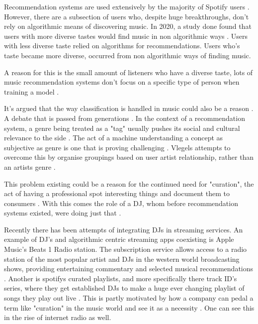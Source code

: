 Recommendation systems are used extensively by the majority of Spotify users \citep{spotify_spotify_2020}. However, there are a subsection of users who, despite huge breakthroughs, don't rely on algorithmic means of discovering music. In 2020, a study done found that users with more diverse tastes would find music in non algorithmic ways \citep{anderson_algorithmic_2020}. Users with less diverse taste relied on algorithms for recommendations. Users who's taste became more diverse, occurred from non algorithmic ways of finding music.

A reason for this is the small amount of listeners who have a diverse taste, lots of music recommendation systems don't focus on a specific type of person when training a model \citep{laplante_improving_2014}.

It's argued that the way classification is handled in music could also be a reason \citep{porcaro_diversity_2021}. A debate that is passed from generations \citep{moles_sociodynamique_2019} \citep{dimaggio_classification_1987} \citep{bourdieu_distinction_2010}. In the context of a recommendation system, a genre being treated as a "tag" usually pushes its social and cultural relevance to the side \citep{porcaro_diversity_2021}. The act of a machine understanding a concept as subjective as genre is one that is proving challenging \citep{nurnberger_survey_2014}. Vlegels attempts to overcome this by organise groupings based on user artist relationship, rather than an artists genre \citep{vlegels_music_2017}.

This problem existing could be a reason for the continued need for "curation", the act of having a professional spot interesting things and document them to consumers \citep{barna_perfect_2017}. With this comes the role of a DJ, whom before recommendation systems existed, were doing just that \citep{percival_music_2011}. 

Recently there has been attempts of integrating DJs in streaming services.  An example of DJ's and algorithmic centric streaming apps coexisting is Apple Music's Beats 1 Radio station. The subscription service allows access to a radio station of the most popular artist and DJs in the western world broadcasting shows, providing entertaining commentary and selected musical recommendations \citep{dms_apple_2020}. Another is spotifys curated playlists, and more specifically there track ID's series, where they get established DJs to make a huge ever changing playlist of songs they play out live \citep{spotify_introducing_2020}. This is partly motivated by how a company can pedal a term like "curation" in the music world and see it as a necessity \citep{barna_perfect_2017}. One can see this in the rise of internet radio as well.  

